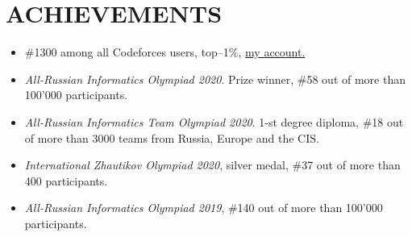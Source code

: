 \section*{ACHIEVEMENTS}
\noindent
\vspace*{-0.5cm}
\begin{itemize}
	\item \#1300 among all Codeforces users, top--1\%, \href{https://codeforces.com/profile/tgritsaev}{my account.}
	\item \emph{All-Russian Informatics Olympiad 2020}. Prize winner, \#58 out of more than 100'000 participants.
	\item \emph{All-Russian Informatics Team Olympiad 2020}. 1-st degree diploma, \#18 out of more than 3000 teams from Russia, Europe and the CIS.
	\item \emph{International Zhautikov Olympiad 2020}, silver medal, \#37 out of more than 400 participants.
    \item \emph{All-Russian Informatics Olympiad 2019}, \#140 out of more than 100'000 participants.
\end{itemize}